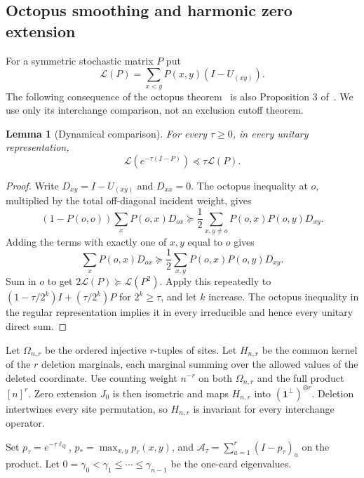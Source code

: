 \documentclass[11pt]{article}
\newtheorem{lemma}[theorem]{Lemma}
\theoremstyle{remark}
\newcommand{\ind}{\mathbf 1}
\begin{document}
\subsection{Octopus smoothing and harmonic zero extension}
For a symmetric stochastic matrix $P$ put
\[
 \mathcal L(P)=\sum_{x<y}P(x,y)(I-U_{(xy)}).
\]
The following consequence of the octopus theorem~\cite{CLR} is also Proposition 3 of~\cite{HKS}. We use only its interchange comparison, not an exclusion cutoff theorem.

\begin{lemma}[Dynamical comparison]\label{lem:octopus}
For every $\tau\geq0$, in every unitary representation,
\[
 \mathcal L(e^{-\tau(I-P)})\preceq\tau\mathcal L(P).
\]
\end{lemma}
\begin{proof}
Write $D_{xy}=I-U_{(xy)}$ and $D_{xx}=0$. The octopus inequality at $o$, multiplied by the total off-diagonal incident weight, gives
\[
 (1-P(o,o))\sum_xP(o,x)D_{ox}
 \succeq \frac12\sum_{x,y\ne o}P(o,x)P(o,y)D_{xy}.
\]
Adding the terms with exactly one of $x,y$ equal to $o$ gives
\[
 \sum_xP(o,x)D_{ox}\succeq\frac12\sum_{x,y}P(o,x)P(o,y)D_{xy}.
\]
Sum in $o$ to get $2\mathcal L(P)\succeq\mathcal L(P^2)$. Apply this repeatedly to $(1-\tau/2^k)I+(\tau/2^k)P$ for $2^k\geq\tau$, and let $k$ increase. The octopus inequality in the regular representation implies it in every irreducible and hence every unitary direct sum.
\end{proof}

Let $\Omega_{n,r}$ be the ordered injective $r$-tuples of sites. Let $H_{n,r}$ be the common kernel of the $r$ deletion marginals, each marginal summing over the allowed values of the deleted coordinate. Use counting weight $n^{-r}$ on both $\Omega_{n,r}$ and the full product $[n]^r$. Zero extension $J_0$ is then isometric and maps $H_{n,r}$ into $(\ind^\perp)^{\otimes r}$. Deletion intertwines every site permutation, so $H_{n,r}$ is invariant for every interchange operator.

Set $p_\tau=e^{-\tau\ell_Q}$, $p_* =\max_{x,y}p_\tau(x,y)$, and
$\mathcal A_\tau=\sum_{a=1}^r(I-p_\tau)_a$ on the product. Let
$0=\gamma_0<\gamma_1\leq\cdots\leq\gamma_{n-1}$ be the one-card eigenvalues.
\end{document}
